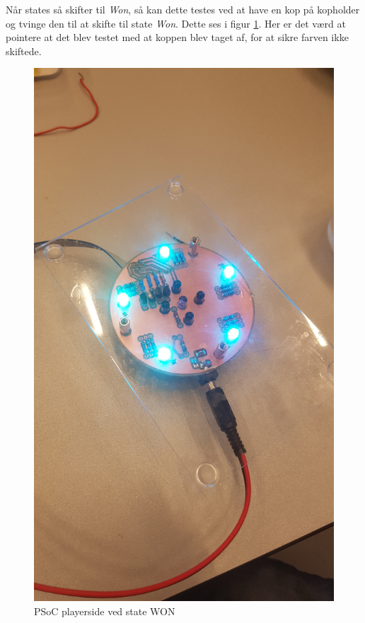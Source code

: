 \documentclass[Integrationstest/Integrationstest_main.tex]{subfiles}
\begin{document}
Når states så skifter til \textit{Won}, så kan dette testes ved at have en kop på kopholder og tvinge den til at skifte til state \textit{Won}. Dette ses i figur \ref{fig:int_playerside_won}. Her er det værd at pointere at det blev testet med at koppen blev taget af, for at sikre farven ikke skiftede.
\begin{figure}[H]
    \centering
    \includegraphics[width=\textwidth]{Integrationstest/Integrationstest_PlayerSide/graphics/CupSensorInt/WON.jpg}
    \caption{PSoC playerside ved state WON}
    \label{fig:int_playerside_won}
\end{figure}
\end{document}
